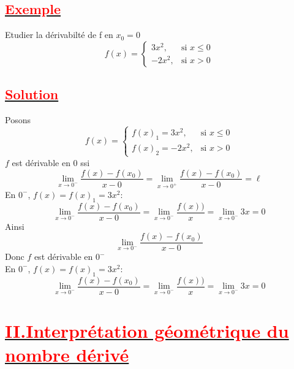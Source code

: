\documentclass[12pt]{article}
\begin{document}
\subsection*{\underline{\textbf{\textcolor{red}{Exemple}}}}
Etudier la dérivabilté de f en $x_{0}=0$\\
\[ f(x) = \begin{cases} 
  3x^{2}, & \text{si } x \leq 0 \\
  -2x^{2}, & \text{si } x > 0 
\end{cases} \]
\subsection*{\underline{\textbf{\textcolor{red}{Solution}}}}
Posons \[ f(x) = \begin{cases} 
  f(x)_{1}=3x^{2}, & \text{si } x \leq 0 \\
  f(x)_{2}=-2x^{2}, & \text{si } x > 0 
\end{cases} \]
$f$ est dérivable en 0 ssi \[\lim_{x \to 0^{-}}\frac{f(x)-f(x_{0})}{x-0}=\lim_{x \to 0^{+}}\frac{f(x)-f(x_{0})}{x-0}=\ell\]
En $0^{-}$, $f(x)=f(x)_{1}=3x^{2}$: \\
\[\lim_{x \to 0^{-}}\frac{f(x)-f(x_{0})}{x-0}=\lim_{x \to 0^{-}}\frac{f(x))}{x}=\lim_{x \to 0^{-}}3x=0\]
Ainsi \[\lim_{x \to 0^{-}}\frac{f(x)-f(x_{0})}{x-0}\]
Donc $f$ est dérivable en $0^{-}$\\
En $0^{-}$, $f(x)=f(x)_{1}=3x^{2}$: \\

\[\lim_{x \to 0^{-}}\frac{f(x)-f(x_{0})}{x-0}=\lim_{x \to 0^{-}}\frac{f(x))}{x}=\lim_{x \to 0^{-}}3x=0\]
\section*{\underline{\textbf{\textcolor{red}{II.Interprétation géométrique du nombre dérivé}}}}
\end{document}
